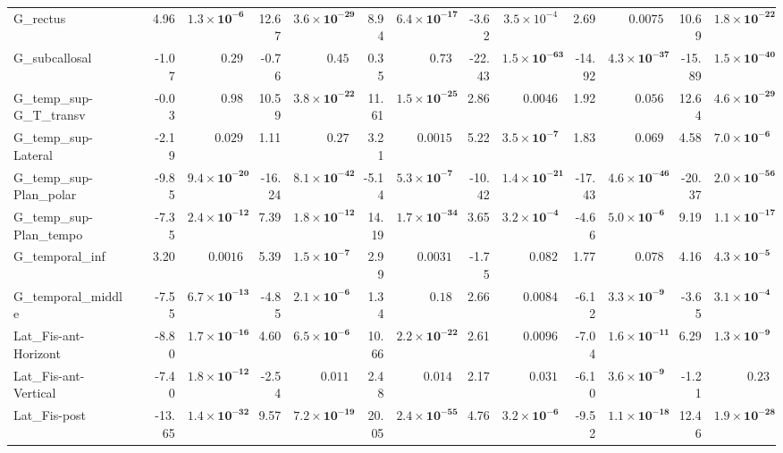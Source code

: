{\begin{longtable}{llrrrrrrrrrrrr}
G\_rectus &  & 4.96 & $\mathbf{1.3{\times}10^{-6}}$ & 12.67 & $\mathbf{3.6{\times}10^{-29}}$ & 8.94 & $\mathbf{6.4{\times}10^{-17}}$ & -3.62 & $3.5{\times}10^{-4}$ & 2.69 & $0.0075$ & 10.69 & $\mathbf{1.8{\times}10^{-22}}$ \\
G\_subcallosal &  & -1.07 & $0.29$ & -0.76 & $0.45$ & 0.35 & $0.73$ & -22.43 & $\mathbf{1.5{\times}10^{-63}}$ & -14.92 & $\mathbf{4.3{\times}10^{-37}}$ & -15.89 & $\mathbf{1.5{\times}10^{-40}}$ \\
G\_temp\_sup-G\_T\_transv &  & -0.03 & $0.98$ & 10.59 & $\mathbf{3.8{\times}10^{-22}}$ & 11.61 & $\mathbf{1.5{\times}10^{-25}}$ & 2.86 & $0.0046$ & 1.92 & $0.056$ & 12.64 & $\mathbf{4.6{\times}10^{-29}}$ \\
G\_temp\_sup-Lateral &  & -2.19 & $0.029$ & 1.11 & $0.27$ & 3.21 & $0.0015$ & 5.22 & $\mathbf{3.5{\times}10^{-7}}$ & 1.83 & $0.069$ & 4.58 & $\mathbf{7.0{\times}10^{-6}}$ \\
G\_temp\_sup-Plan\_polar &  & -9.85 & $\mathbf{9.4{\times}10^{-20}}$ & -16.24 & $\mathbf{8.1{\times}10^{-42}}$ & -5.14 & $\mathbf{5.3{\times}10^{-7}}$ & -10.42 & $\mathbf{1.4{\times}10^{-21}}$ & -17.43 & $\mathbf{4.6{\times}10^{-46}}$ & -20.37 & $\mathbf{2.0{\times}10^{-56}}$ \\
G\_temp\_sup-Plan\_tempo &  & -7.35 & $\mathbf{2.4{\times}10^{-12}}$ & 7.39 & $\mathbf{1.8{\times}10^{-12}}$ & 14.19 & $\mathbf{1.7{\times}10^{-34}}$ & 3.65 & $\mathbf{3.2{\times}10^{-4}}$ & -4.66 & $\mathbf{5.0{\times}10^{-6}}$ & 9.19 & $\mathbf{1.1{\times}10^{-17}}$ \\
G\_temporal\_inf &  & 3.20 & $0.0016$ & 5.39 & $\mathbf{1.5{\times}10^{-7}}$ & 2.99 & $0.0031$ & -1.75 & $0.082$ & 1.77 & $0.078$ & 4.16 & $\mathbf{4.3{\times}10^{-5}}$ \\
G\_temporal\_middle &  & -7.55 & $\mathbf{6.7{\times}10^{-13}}$ & -4.85 & $\mathbf{2.1{\times}10^{-6}}$ & 1.34 & $0.18$ & 2.66 & $0.0084$ & -6.12 & $\mathbf{3.3{\times}10^{-9}}$ & -3.65 & $\mathbf{3.1{\times}10^{-4}}$ \\
Lat\_Fis-ant-Horizont &  & -8.80 & $\mathbf{1.7{\times}10^{-16}}$ & 4.60 & $\mathbf{6.5{\times}10^{-6}}$ & 10.66 & $\mathbf{2.2{\times}10^{-22}}$ & 2.61 & $0.0096$ & -7.04 & $\mathbf{1.6{\times}10^{-11}}$ & 6.29 & $\mathbf{1.3{\times}10^{-9}}$ \\
Lat\_Fis-ant-Vertical &  & -7.40 & $\mathbf{1.8{\times}10^{-12}}$ & -2.54 & $0.011$ & 2.48 & $0.014$ & 2.17 & $0.031$ & -6.10 & $\mathbf{3.6{\times}10^{-9}}$ & -1.21 & $0.23$ \\
Lat\_Fis-post &  & -13.65 & $\mathbf{1.4{\times}10^{-32}}$ & 9.57 & $\mathbf{7.2{\times}10^{-19}}$ & 20.05 & $\mathbf{2.4{\times}10^{-55}}$ & 4.76 & $\mathbf{3.2{\times}10^{-6}}$ & -9.52 & $\mathbf{1.1{\times}10^{-18}}$ & 12.46 & $\mathbf{1.9{\times}10^{-28}}$ \\

\end{longtable}}
